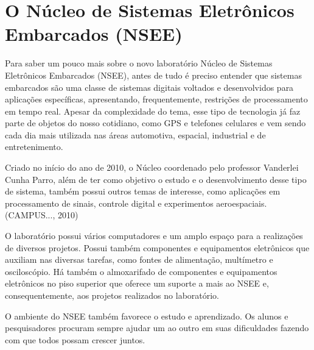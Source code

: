 
\section{O Núcleo de Sistemas Eletrônicos Embarcados (NSEE)}
Para saber um pouco mais sobre o novo laboratório Núcleo de Sistemas Eletrônicos Embarcados (NSEE), antes de tudo é preciso entender que sistemas embarcados são uma classe de sistemas digitais voltados e desenvolvidos para aplicações específicas, apresentando, frequentemente, restrições de processamento em tempo real. Apesar da complexidade do tema, esse tipo de tecnologia já faz parte de objetos do nosso cotidiano, como GPS e telefones celulares e vem sendo cada dia mais utilizada nas áreas automotiva, espacial, industrial e de entretenimento.

Criado no início do ano de 2010, o Núcleo coordenado pelo professor Vanderlei Cunha Parro, além de ter como objetivo o estudo e o desenvolvimento desse tipo de sistema, também possui outros temas de interesse, como aplicações em processamento de sinais, controle digital e experimentos aeroespaciais.(\uppercase{Campus...}, 2010) \let\thefootnote\relax{}

O laboratório possui vários computadores e um amplo espaço para a realizações de diversos projetos. Possui também componentes e equipamentos eletrônicos que auxiliam nas diversas tarefas, como fontes de alimentação, multímetro e osciloscópio. Há também o almoxarifado de componentes e equipamentos eletrônicos no piso superior que oferece um suporte a mais ao NSEE e, consequentemente, aos projetos realizados no laboratório. 

O ambiente do NSEE também favorece o estudo e aprendizado. Os alunos e pesquisadores procuram sempre ajudar um ao outro em suas dificuldades fazendo com que todos possam crescer juntos.

